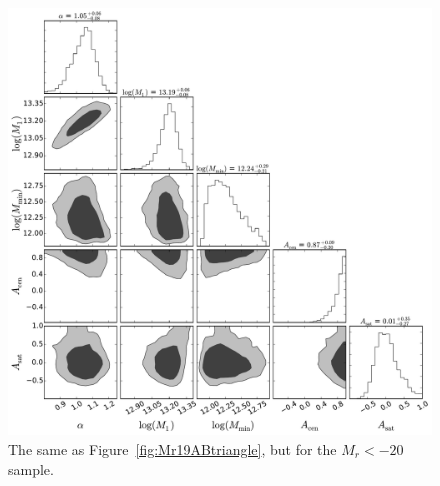 \documentclass[usenatbib,usegraphicx,letterpaper]{mn2e}
\begin{document}
\begin{figure}
\begin{center}
\includegraphics[width=15.0cm]{Mr20ABTri.pdf}
\caption{
The same as Figure~\ref{fig:Mr19ABtriangle}, but for the $M_r<-20$ sample.
}
\label{fig:Mr20ABtriangle}
\end{center}
\end{figure}
\end{document}
